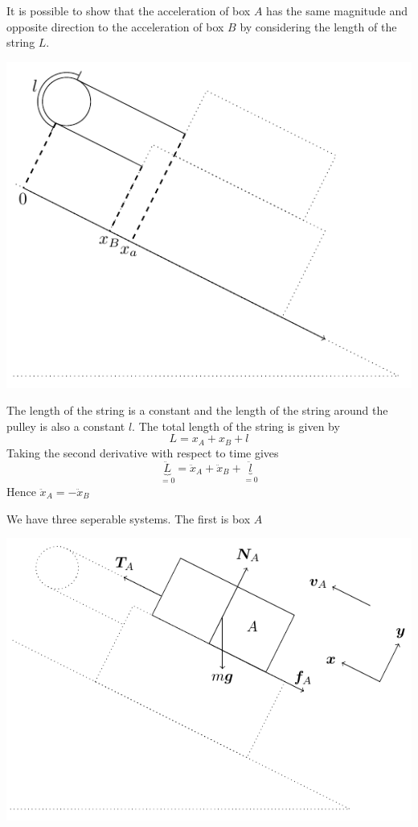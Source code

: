 \documentclass{article}
\begin{document}
It is possible to show that the acceleration of box \(A\) has the same magnitude and opposite direction to the acceleration of box \(B\) by considering the length of the string \(L\).

\begin{center}
\includegraphics[scale=0.4]{StringLength}
\end{center}

The length of the string is a constant and the length of the string around the pulley is also a constant \(l\). The total length of the string is given by
\[L=x_A+x_B+l\]
Taking the second derivative with respect to time gives
\[\underbrace{\ddot L}_{=0}=\ddot x_A+\ddot x_B+\underbrace{\ddot l}_{=0}\]
Hence \(\ddot x_A=-\ddot x_B\)

We have three seperable systems. The first is box \(A\)

\begin{center}
\includegraphics[scale=0.4]{BoxA}
\end{center}
\end{document}
